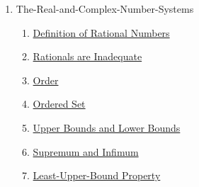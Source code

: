 \clearpage
\renewcommand{\notetitle}{Table of Contents}
\label{toc}
\begin{enumerate}

\item The-Real-and-Complex-Number-Systems
\begin{enumerate}
\item \hyperref[202501131947]{Definition of Rational Numbers}
\item \hyperref[202501132004]{Rationals are Inadequate}
\item \hyperref[202501141228]{Order}
\item \hyperref[202501141241]{Ordered Set}
\item \hyperref[202501141250]{Upper Bounds and Lower Bounds}
\item \hyperref[202501141546]{Supremum and Infimum}
\item \hyperref[202501141632]{Least-Upper-Bound Property}
\end{enumerate}
\end{enumerate}

\newpage
